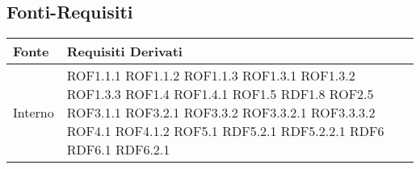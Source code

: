 
	\subsection{Fonti-Requisiti} %
	\label{sub:fonti_requisiti}

	\begin{center}

	\def\arraystretch{1.5}
	\bgroup
	\begin{longtable}{| p{4cm} | p{4cm} |}

		\hline
		\textbf{Fonte} & \textbf{Requisiti Derivati} \\
		\hline

		Interno  &  ROF1.1.1 \newline ROF1.1.2 \newline ROF1.1.3 \newline ROF1.3.1 \newline ROF1.3.2 \newline ROF1.3.3 \newline ROF1.4 \newline ROF1.4.1 \newline ROF1.5 \newline RDF1.8 \newline ROF2.5 \newline ROF3.1.1 \newline ROF3.2.1 \newline ROF3.3.2 \newline ROF3.3.2.1 \newline ROF3.3.3.2 \newline ROF4.1 \newline ROF4.1.2 \newline ROF5.1 \newline RDF5.2.1 \newline RDF5.2.2.1 \newline RDF6 \newline RDF6.1 \newline RDF6.2.1 \n
\end{longtable}
\end{center}

